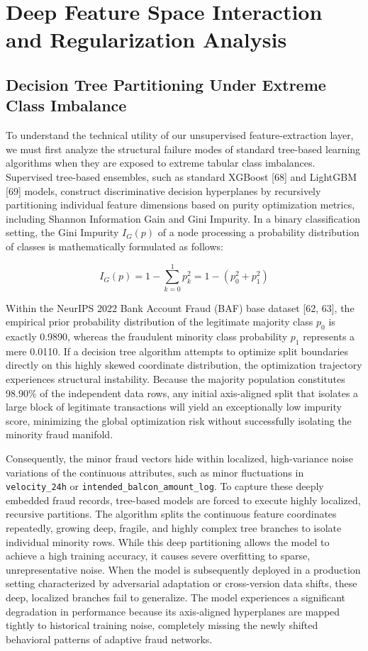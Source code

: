 \documentclass[11pt,a4paper]{report}
\begin{document}
\section{Deep Feature Space Interaction and Regularization Analysis}

\subsection{Decision Tree Partitioning Under Extreme Class Imbalance}
To understand the technical utility of our unsupervised feature-extraction layer, we must first analyze the structural failure modes of standard tree-based learning algorithms when they are exposed to extreme tabular class imbalances. Supervised tree-based ensembles, such as standard XGBoost [68] and LightGBM [69] models, construct discriminative decision hyperplanes by recursively partitioning individual feature dimensions based on purity optimization metrics, including Shannon Information Gain and Gini Impurity. In a binary classification setting, the Gini Impurity $I_{G}(p)$ of a node processing a probability distribution of classes is mathematically formulated as follows:

\begin{equation}
I_{G}(p)=1-\sum_{k=0}^{1}p_{k}^{2}=1-(p_{0}^{2}+p_{1}^{2})
\end{equation}

Within the NeurIPS 2022 Bank Account Fraud (BAF) base dataset [62, 63], the empirical prior probability distribution of the legitimate majority class $p_{0}$ is exactly 0.9890, whereas the fraudulent minority class probability $p_{1}$ represents a mere 0.0110. If a decision tree algorithm attempts to optimize split boundaries directly on this highly skewed coordinate distribution, the optimization trajectory experiences structural instability. Because the majority population constitutes 98.90\% of the independent data rows, any initial axis-aligned split that isolates a large block of legitimate transactions will yield an exceptionally low impurity score, minimizing the global optimization risk without successfully isolating the minority fraud manifold. 

Consequently, the minor fraud vectors hide within localized, high-variance noise variations of the continuous attributes, such as minor fluctuations in \texttt{velocity\_24h} or \texttt{intended\_balcon\_amount\_log}. To capture these deeply embedded fraud records, tree-based models are forced to execute highly localized, recursive partitions. The algorithm splits the continuous feature coordinates repeatedly, growing deep, fragile, and highly complex tree branches to isolate individual minority rows. While this deep partitioning allows the model to achieve a high training accuracy, it causes severe overfitting to sparse, unrepresentative noise. When the model is subsequently deployed in a production setting characterized by adversarial adaptation or cross-version data shifts, these deep, localized branches fail to generalize. The model experiences a significant degradation in performance because its axis-aligned hyperplanes are mapped tightly to historical training noise, completely missing the newly shifted behavioral patterns of adaptive fraud networks.
\end{document}
